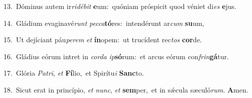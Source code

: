 {\numbfont\textcolor{\numbcolor}{13.}}~Dóminus autem ir\-\textit{ri}\-\textit{dé}\textit{bit} \textbf{e}\-um:~\star quóniam próspicit quod véniet di\textit{es} \textbf{e}\-jus.\par
{\numbfont\textcolor{\numbcolor}{14.}}~Gládium evaginavé\textit{runt} \textit{pec}\-\textit{ca}\textbf{tó}res:~\star intendérunt ar\textit{cum} \textbf{su}\-um,\par
{\numbfont\textcolor{\numbcolor}{15.}}~Ut dejíciant páu\-\textit{pe}\-\textit{rem} \textit{et} \textbf{ín}\-opem:~\star ut trucídent rec\textit{tos} \textbf{cor}\-de.\par
{\numbfont\textcolor{\numbcolor}{16.}}~Gládius eórum intret in \textit{cor}\-\textit{da} \textit{ip}\-\textbf{só}rum:~\star et arcus eórum con\-\textit{frin}\-\textbf{gá}tur.\par
{\numbfont\textcolor{\numbcolor}{17.}}~Glória \textit{Pa}\-\textit{tri}, \textit{et} \textbf{Fí}\-lio,~\star et Spirítu\textit{i} \textbf{Sanc}\-to.\par
{\numbfont\textcolor{\numbcolor}{18.}}~Sicut erat in princípio, \textit{et} \textit{nunc}\-, \textit{et} \textbf{sem}\-per,~\star et in sǽcula sæculó\-\textit{rum}\-. \textbf{A}\-men.\par
